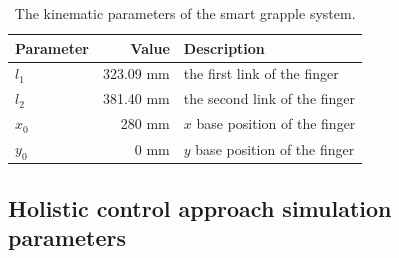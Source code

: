 \begin{table}[h!]
\centering
\caption{The kinematic parameters of the smart grapple system.}
\begin{tabularx}{\linewidth}{l r X}
        \toprule
        \textbf{Parameter} & \textbf{Value} &  \textbf{Description} \\
        \midrule
        $l_1$ & 323.09 mm & the first link of the finger \\
        $l_2$ & 381.40 mm & the second link of the finger \\
        $x_0$ & 280 mm & $x$ base position of the finger\\
        $y_0$ & 0 mm & $y$ base position of the finger\\
        \bottomrule
    \end{tabularx}
\label{tab:grapple_kinematics}
\end{table}

\newpage

 \subsection{Holistic control approach simulation parameters} \label{appendix:simparameters}

